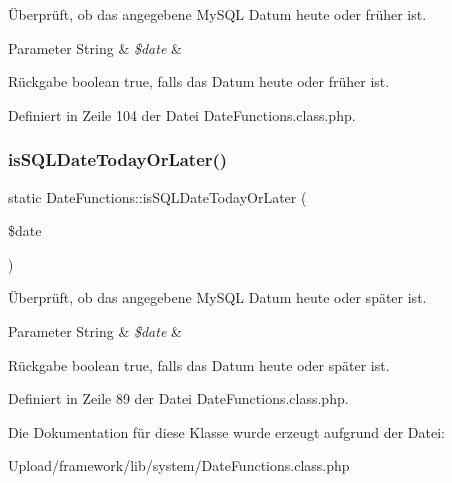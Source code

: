 Überprüft, ob das angegebene My\+S\+QL Datum heute oder früher ist. 
\begin{DoxyParams}[1]{Parameter}
String & {\em \$date} & \\
\hline
\end{DoxyParams}
\begin{DoxyReturn}{Rückgabe}
boolean true, falls das Datum heute oder früher ist. 
\end{DoxyReturn}


Definiert in Zeile 104 der Datei Date\+Functions.\+class.\+php.

\mbox{\label{class_date_functions_ad87c02034e1932f94ebe93f93cf9791d}} 
\subsubsection{\texorpdfstring{is\+S\+Q\+L\+Date\+Today\+Or\+Later()}{isSQLDateTodayOrLater()}}
{\footnotesize\ttfamily static Date\+Functions\+::is\+S\+Q\+L\+Date\+Today\+Or\+Later (\begin{DoxyParamCaption}\item[{}]{\$date }\end{DoxyParamCaption})\hspace{0.3cm}{\ttfamily [static]}}

Überprüft, ob das angegebene My\+S\+QL Datum heute oder später ist. 
\begin{DoxyParams}[1]{Parameter}
String & {\em \$date} & \\
\hline
\end{DoxyParams}
\begin{DoxyReturn}{Rückgabe}
boolean true, falls das Datum heute oder später ist. 
\end{DoxyReturn}


Definiert in Zeile 89 der Datei Date\+Functions.\+class.\+php.



Die Dokumentation für diese Klasse wurde erzeugt aufgrund der Datei\+:\begin{DoxyCompactItemize}
\item 
Upload/framework/lib/system/Date\+Functions.\+class.\+php\end{DoxyCompactItemize}
